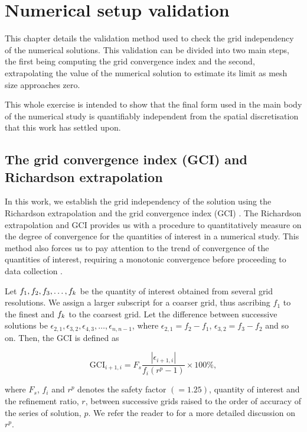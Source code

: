 \documentclass[oneside]{utmthesis}
\begin{document}
\chapter{Numerical setup validation} \label{chap:numSetup}
This chapter details the validation method used to check the grid independency of the numerical solutions. This validation can be divided into two main steps, the first being computing the grid convergence index and the second, extrapolating the value of the numerical solution to estimate its limit as mesh size approaches zero.

This whole exercise is intended to show that the final form used in the main body of the numerical study is quantifiably independent from the spatial discretisation that this work has settled upon.

\section{The grid convergence index (GCI) and Richardson extrapolation} \label{sec:richExtrap}
In this work, we establish the grid independency of the solution using the Richardson extrapolation and the grid convergence index (GCI) \citep{Richardson1927,Stern2001}. The Richardson extrapolation and GCI provides us with a procedure to quantitatively measure on the degree of convergence for the quantities of interest in a numerical study. This method also forces us to pay attention to the trend of convergence of the quantities of interest, requiring a monotonic convergence before proceeding to data collection \citep{Stern2001,MatAli2011,Ali2012,Maruai2018}.

Let $f_{1},f_{2},f_{3},\dots,f_{k}$ be the quantity of interest obtained from several grid resolutions. We assign a larger subscript for a coarser grid, thus ascribing $f_{1}$ to the finest and $f_{k}$ to the coarsest grid. Let the difference between successive solutions be $\epsilon_{2,1},\epsilon_{3,2},\epsilon_{4,3},\dots,\epsilon_{n,n-1}$, where $\epsilon_{2,1} = f_{2} - f_{1}$, $\epsilon_{3,2} = f_{3} - f_{2}$ and so on. Then, the GCI is defined as

\begin{equation}
  \text{GCI}_{i+1,i} = F_{s} \frac{\left |\epsilon_{i+1,i} \right |}{f_{i} \left ( r^{p} - 1 \right )} \times 100\%,
  \label{eq:gci}
\end{equation}

\noindent where $F_{s}$, $f_{i}$ and $r^{p}$ denotes the safety factor $\left ( = 1.25 \right )$, quantity of interest and the refinement ratio, $r$, between successive grids raised to the order of accuracy of the series of solution, $p$. We refer the reader to \citet{Stern2001,Langley2018} for a more detailed discussion on $r^{p}$.
\end{document}
